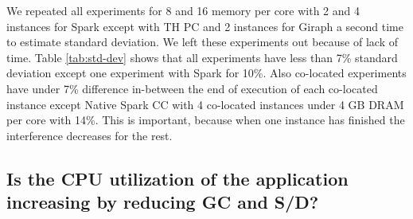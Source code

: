 We repeated all experiments for 8 and 16 memory per core with 2 and 4 instances for Spark except with TH PC and 2 instances for Giraph a second time to estimate standard deviation. We left these experiments out because of lack of time. Table \ref{tab:std-dev} shows that 
all experiments have less than 7\% standard deviation except one experiment with Spark for 10\%. Also co-located experiments have under 7\% difference in-between the end of execution of each co-located instance except Native Spark CC with 4 co-located instances under 4 GB DRAM per core with 14\%. This is important, because when one instance has finished the interference decreases for the rest.

\subsection{Is the CPU utilization of the application increasing by reducing GC and S/D?}

